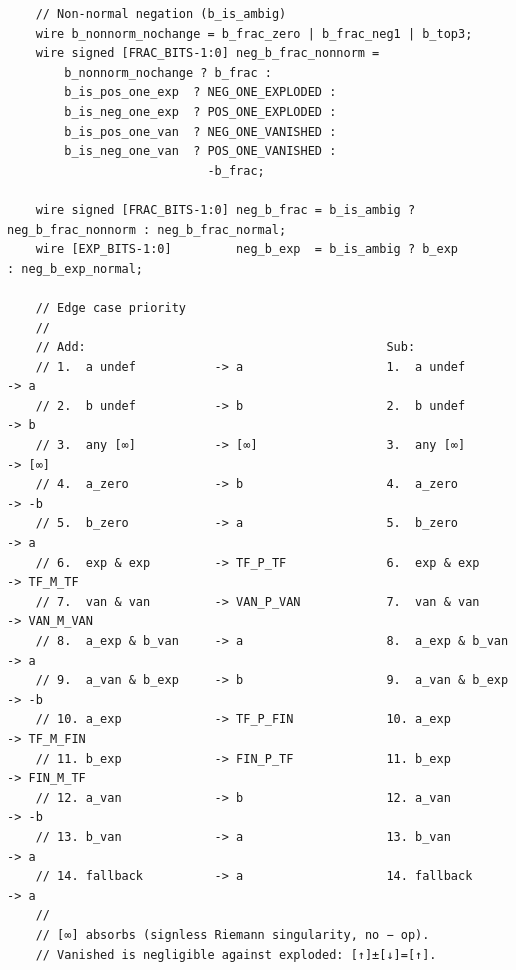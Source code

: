 \documentclass[12pt,letter]{article}
\begin{document}
\begin{lstlisting}
    // Non-normal negation (b_is_ambig)
    wire b_nonnorm_nochange = b_frac_zero | b_frac_neg1 | b_top3;
    wire signed [FRAC_BITS-1:0] neg_b_frac_nonnorm =
        b_nonnorm_nochange ? b_frac :
        b_is_pos_one_exp  ? NEG_ONE_EXPLODED :
        b_is_neg_one_exp  ? POS_ONE_EXPLODED :
        b_is_pos_one_van  ? NEG_ONE_VANISHED :
        b_is_neg_one_van  ? POS_ONE_VANISHED :
                            -b_frac;

    wire signed [FRAC_BITS-1:0] neg_b_frac = b_is_ambig ? neg_b_frac_nonnorm : neg_b_frac_normal;
    wire [EXP_BITS-1:0]         neg_b_exp  = b_is_ambig ? b_exp               : neg_b_exp_normal;

    // Edge case priority
    //
    // Add:                                          Sub:
    // 1.  a undef           -> a                    1.  a undef           -> a
    // 2.  b undef           -> b                    2.  b undef           -> b
    // 3.  any [∞]           -> [∞]                  3.  any [∞]           -> [∞]
    // 4.  a_zero            -> b                    4.  a_zero            -> -b
    // 5.  b_zero            -> a                    5.  b_zero            -> a
    // 6.  exp & exp         -> TF_P_TF              6.  exp & exp         -> TF_M_TF
    // 7.  van & van         -> VAN_P_VAN            7.  van & van         -> VAN_M_VAN
    // 8.  a_exp & b_van     -> a                    8.  a_exp & b_van     -> a
    // 9.  a_van & b_exp     -> b                    9.  a_van & b_exp     -> -b
    // 10. a_exp             -> TF_P_FIN             10. a_exp             -> TF_M_FIN
    // 11. b_exp             -> FIN_P_TF             11. b_exp             -> FIN_M_TF
    // 12. a_van             -> b                    12. a_van             -> -b
    // 13. b_van             -> a                    13. b_van             -> a
    // 14. fallback          -> a                    14. fallback          -> a
    //
    // [∞] absorbs (signless Riemann singularity, no − op).
    // Vanished is negligible against exploded: [↑]±[↓]=[↑].


\end{lstlisting}
\end{document}
